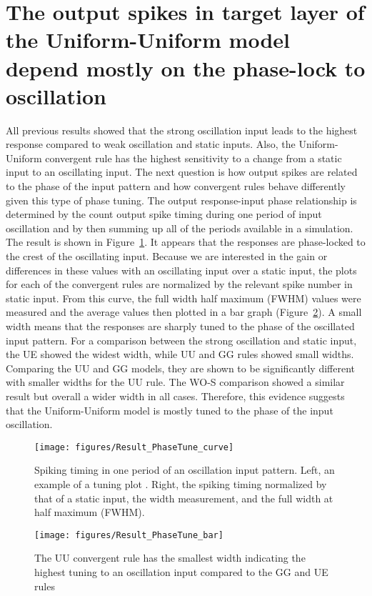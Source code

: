  
\section{The output spikes in target layer of the Uniform-Uniform model depend mostly on the phase-lock to oscillation}
  All previous results showed that the strong oscillation input leads to the highest response compared to weak oscillation and static inputs. Also, the Uniform-Uniform convergent rule has the highest sensitivity to a change from a static input to an oscillating input. 
The next question is how output spikes are related to the phase of the input pattern and how convergent rules behave differently given this type of phase tuning. 
The output response-input phase relationship is determined by the count output spike timing during one period of input oscillation and by then summing up all of the periods available in a simulation.  The result is shown in Figure~\ref{fig:PhaseCurve}. It appears that the responses are phase-locked to the crest of the oscillating input.
Because we are interested in the gain or differences in these values with an oscillating input over a static input, the plots for each of the convergent rules are normalized by the relevant spike number in static input. From this curve, the full width half maximum (FWHM) values were measured and the average values then plotted in a bar graph (Figure~\ref{fig:PhaseBar}). A small width means that the responses are sharply tuned to the phase of the oscillated input pattern. For a comparison between the strong oscillation and static input, the UE showed the widest width, while UU and GG rules showed small widths. Comparing the UU and GG models, they are shown to be significantly different with smaller widths for the UU rule. The WO-S comparison showed a similar result but overall a wider width in all cases. Therefore, this evidence suggests that the Uniform-Uniform model is mostly tuned to the phase of the input oscillation.




\begin{figure}[!h]
	\centering
	\texttt{[image: figures/Result\_PhaseTune\_curve]}
	\caption{Spiking timing in one period of an oscillation input pattern. Left, an example of a tuning plot . Right, the spiking timing normalized by that of a static input, the width measurement, and the full width at half maximum (FWHM).} 			\label{fig:PhaseCurve}
\end{figure}

\begin{figure}[!h]
	\centering
	\texttt{[image: figures/Result\_PhaseTune\_bar]}
	\caption{The UU convergent rule has the smallest width indicating the highest tuning to an oscillation input compared to the GG and UE rules} 
	\label{fig:PhaseBar}
\end{figure}


